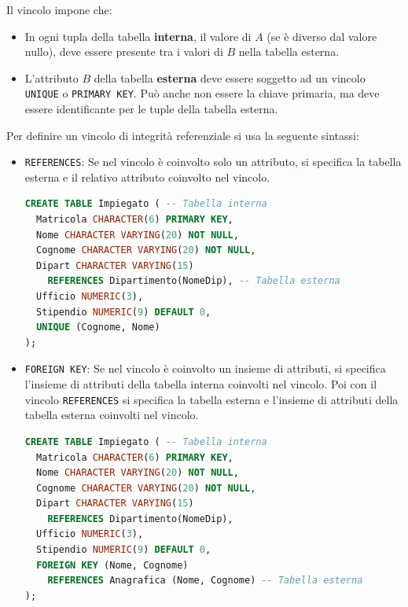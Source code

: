 \documentclass[a4paper]{article}
\begin{document}
Il vincolo impone che:
\begin{itemize}
  \item In ogni tupla della tabella \textbf{interna}, il valore di
    \( A \) (se è diverso dal valore nullo), deve essere presente tra i valori di \( B \) 
    nella tabella esterna.

  \item L'attributo \( B \) della tabella \textbf{esterna} deve essere soggetto ad
    un vincolo \texttt{UNIQUE} o \texttt{PRIMARY KEY}. Può anche non essere la chiave
    primaria, ma deve essere identificante per le tuple della tabella esterna.
\end{itemize}
Per definire un vincolo di integrità referenziale si usa la seguente sintassi:
\begin{itemize}
  \item \texttt{REFERENCES}: Se nel vincolo è coinvolto solo un attributo, si
    specifica la tabella esterna e il relativo attributo coinvolto nel vincolo.

\begin{lstlisting}[language=SQL]
CREATE TABLE Impiegato ( -- Tabella interna
  Matricola CHARACTER(6) PRIMARY KEY,
  Nome CHARACTER VARYING(20) NOT NULL,
  Cognome CHARACTER VARYING(20) NOT NULL,
  Dipart CHARACTER VARYING(15)
    REFERENCES Dipartimento(NomeDip), -- Tabella esterna
  Ufficio NUMERIC(3),
  Stipendio NUMERIC(9) DEFAULT 0,
  UNIQUE (Cognome, Nome)
);
\end{lstlisting}

  \item \texttt{FOREIGN KEY}: Se nel vincolo è coinvolto un insieme di attributi,
    si specifica l'insieme di attributi della tabella interna coinvolti nel vincolo.
    Poi con il vincolo \texttt{REFERENCES} si specifica
    la tabella esterna e l'insieme di attributi della tabella esterna coinvolti nel
    vincolo.

\begin{lstlisting}[language=SQL]
CREATE TABLE Impiegato ( -- Tabella interna
  Matricola CHARACTER(6) PRIMARY KEY,
  Nome CHARACTER VARYING(20) NOT NULL,
  Cognome CHARACTER VARYING(20) NOT NULL,
  Dipart CHARACTER VARYING(15)
    REFERENCES Dipartimento(NomeDip),
  Ufficio NUMERIC(3),
  Stipendio NUMERIC(9) DEFAULT 0,
  FOREIGN KEY (Nome, Cognome)
    REFERENCES Anagrafica (Nome, Cognome) -- Tabella esterna
);
\end{lstlisting}

\end{itemize}
\end{document}
